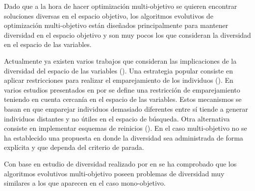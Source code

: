 Dado que a la hora de hacer optimización multi-objetivo se quieren encontrar soluciones diversas en el espacio objetivo, los 
algoritmos evolutivos de optimización multi-objetivo están diseñados principalmente para mantener diversidad en el 
espacio objetivo y son muy pocos los que consideran la diversidad en el espacio de las variables. 

%
Actualmente ya existen varios trabajos que consideran las implicaciones de la diversidad del espacio de las 
variables (\cite{Joel:GECCO17}).
%
Una estrategia popular consiste en aplicar restricciones para realizar el emparejamiento de los individuos 
(\cite{Joel:MOEAD_AMS}).
%
En varios estudios presentados en  por \citeauthor{Joel:STUDY_MATTING_RESTRICTION}
se define una restricción de emparejamiento teniendo en cuenta cercanía en el espacio de las variables.
%
Estos mecanismos se basan en que emparejar individuos demasiado diferentes entre sí tiende a generar individuos distantes 
y no útiles en el espacio de búsqueda.
%
Otra alternativa consiste en implementar esquemas de reinicios 
(\cite{ joel:jaeggi2008development, Joel:Improved_Multiobjective_Diversity_Control_Oriented_Genetic_Algorithm}).
%
En el caso multi-objetivo no se ha establecido una propuesta en donde la diversidad sea administrada de forma explícita 
y que dependa del criterio de parada.

Con base en estudio de diversidad realizado por \citeauthor{Joel:GECCO17} en  se ha comprobado que 
los algoritmos evolutivos multi-objetivo poseen problemas de diversidad muy similares a los que aparecen en el caso mono-objetivo.
%


